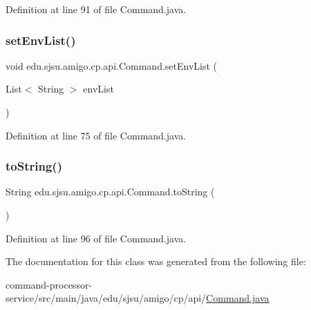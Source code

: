 Definition at line 91 of file Command.\+java.

\mbox{\label{classedu_1_1sjsu_1_1amigo_1_1cp_1_1api_1_1_command_afbbfb4a7a61b9d5cf068942c7c8d8de1}} 
\subsubsection{\texorpdfstring{set\+Env\+List()}{setEnvList()}}
{\footnotesize\ttfamily void edu.\+sjsu.\+amigo.\+cp.\+api.\+Command.\+set\+Env\+List (\begin{DoxyParamCaption}\item[{List$<$ String $>$}]{env\+List }\end{DoxyParamCaption})}



Definition at line 75 of file Command.\+java.

\mbox{\label{classedu_1_1sjsu_1_1amigo_1_1cp_1_1api_1_1_command_ac3596d6b535e34cfb01944fbbbbcf822}} 
\subsubsection{\texorpdfstring{to\+String()}{toString()}}
{\footnotesize\ttfamily String edu.\+sjsu.\+amigo.\+cp.\+api.\+Command.\+to\+String (\begin{DoxyParamCaption}{ }\end{DoxyParamCaption})}



Definition at line 96 of file Command.\+java.



The documentation for this class was generated from the following file\+:\begin{DoxyCompactItemize}
\item 
command-\/processor-\/service/src/main/java/edu/sjsu/amigo/cp/api/\hyperlink{_command_8java}{Command.\+java}\end{DoxyCompactItemize}
